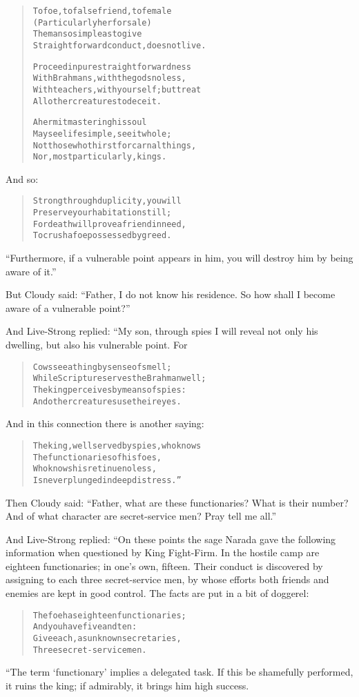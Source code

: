 \documentclass[article, twoside, 14pt]{memoir}
\renewenvironment{verbatim}{%
\begin{quote}%
\vskip -10pt%
\begin{alltt}\normalfont\large}{\end{alltt}%
\end{quote}%
\vskip -10pt
} %
\begin{document}
\begin{verbatim}
To foe, to false friend, to female
(Particularly her for sale)
The man so simple as to give
Straightforward conduct, does not live.

Proceed in pure straightforwardness
With Brahmans, with the gods no less,
With teachers, with yourself; but treat
All other creatures to deceit.

A hermit mastering his soul
May see life simple, see it whole;
Not those who thirst for carnal things,
Nor, most particularly, kings.
\end{verbatim}
And so:

\begin{verbatim}
Strong through duplicity, you will
Preserve your habitation still;
For death will prove a friend in need,
To crush a foe possessed by greed.
\end{verbatim}
``Furthermore, if a vulnerable point appears in him, you will destroy him by being aware of it.''

But Cloudy said:
``Father, I do not know his residence. So how shall I become aware of a vulnerable point?''

And Live-Strong replied: “My son, through spies I will reveal not
only his dwelling, but also his vulnerable point. For

\begin{verbatim}
Cows see a thing by sense of smell;
While Scripture serves the Brahman well;
The king perceives by means of spies:
And other creatures use their eyes.
\end{verbatim}
And in this connection there is another saying:

\begin{verbatim}
The king, well served by spies, who knows
The functionaries of his foes,
Who knows his retinue no less,
Is never plunged in deep distress.”
\end{verbatim}
Then Cloudy said:
``Father, what are these functionaries? What is their number? And of what character are secret-service men? Pray tell me all.''

And Live-Strong replied: “On these points the sage Narada gave the
following information when questioned by King Fight-Firm. In the
hostile camp are eighteen functionaries; in one's own, fifteen.
Their conduct is discovered by assigning to each three
secret-service men, by whose efforts both friends and enemies are
kept in good control. The facts are put in a bit of doggerel:

\begin{verbatim}
The foe has eighteen functionaries;
    And you have five and ten:
Give each, as unknown secretaries,
    Three secret-service men.
\end{verbatim}
“The term `functionary' implies a delegated task. If this be
shamefully performed, it ruins the king; if admirably, it brings
him high success.
\end{document}
